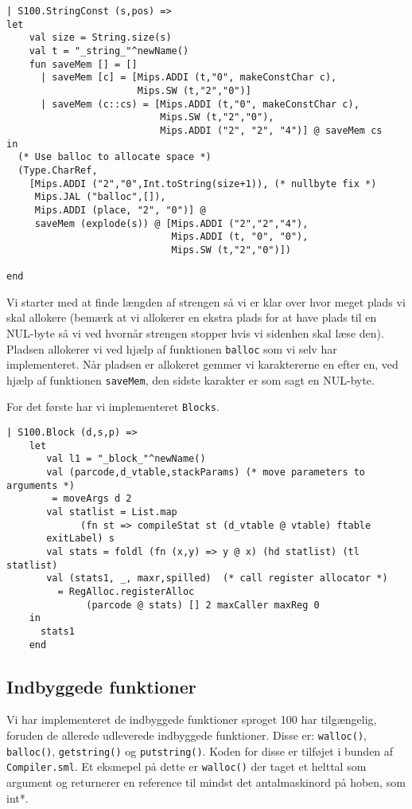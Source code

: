 \documentclass[12pt]{article}
\begin{document}
\begin{verbatim}
| S100.StringConst (s,pos) =>
let
    val size = String.size(s)
    val t = "_string_"^newName()
    fun saveMem [] = []
      | saveMem [c] = [Mips.ADDI (t,"0", makeConstChar c),
                       Mips.SW (t,"2","0")]
      | saveMem (c::cs) = [Mips.ADDI (t,"0", makeConstChar c),
                           Mips.SW (t,"2","0"),
                           Mips.ADDI ("2", "2", "4")] @ saveMem cs
in 
  (* Use balloc to allocate space *)
  (Type.CharRef,
    [Mips.ADDI ("2","0",Int.toString(size+1)), (* nullbyte fix *)
     Mips.JAL ("balloc",[]), 
     Mips.ADDI (place, "2", "0")] @
     saveMem (explode(s)) @ [Mips.ADDI ("2","2","4"),
                             Mips.ADDI (t, "0", "0"),
                             Mips.SW (t,"2","0")])              
           
end
\end{verbatim}

Vi starter med at finde længden af strengen så vi er klar over hvor meget plads
vi skal allokere (bemærk at vi allokerer en ekstra
plads for at have plads til en NUL-byte så vi ved hvornår strengen stopper hvis
vi sidenhen skal læse den). Pladsen allokerer vi ved hjælp af funktionen
\texttt{balloc} som vi selv har implementeret. Når pladsen er allokeret gemmer
vi karaktererne en efter en, ved hjælp af funktionen \texttt{saveMem}, den sidste
karakter er som sagt en NUL-byte. 

For det første har vi implementeret \texttt{Blocks}. 

\begin{verbatim}
| S100.Block (d,s,p) => 
    let
       val l1 = "_block_"^newName()
       val (parcode,d_vtable,stackParams) (* move parameters to arguments *)
        = moveArgs d 2
       val statlist = List.map 
             (fn st => compileStat st (d_vtable @ vtable) ftable
       exitLabel) s
       val stats = foldl (fn (x,y) => y @ x) (hd statlist) (tl statlist)
       val (stats1, _, maxr,spilled)  (* call register allocator *)
         = RegAlloc.registerAlloc
              (parcode @ stats) [] 2 maxCaller maxReg 0
    in
      stats1
    end
\end{verbatim}


\subsection{Indbyggede funktioner}
Vi har implementeret de indbyggede funktioner sproget 100 har tilgængelig, foruden de allerede udleverede indbyggede funktioner. Disse er: \texttt{walloc()}, \texttt{balloc()}, \texttt{getstring()} og \texttt{putstring()}. Koden for disse er tilføjet i bunden af \texttt{Compiler.sml}. Et eksmepel på dette er \texttt{walloc()} der taget et helttal som argument og returnerer en reference til mindst det antalmaskinord på hoben, som int*.\\
\end{document}
